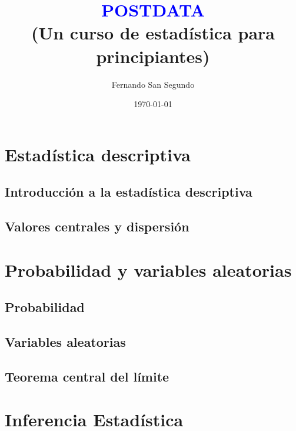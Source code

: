 \documentclass[10pt,a4paper]{book}
\begin{document}
\author{Fernando San Segundo}
\title{\textcolor{blue}{POSTDATA}\\
{\small (Un curso de estadística para principiantes)}}
\date{\today}

\pagestyle{plain}
\maketitle

\setcounter{tocdepth}{1}
\tableofcontents


\part{Estadística descriptiva}
%

    \chapter{Introducción a la estadística descriptiva}%
    

    \chapter{Valores centrales y dispersión}
    

\part{Probabilidad y variables aleatorias}
%   

    \chapter{Probabilidad}
    

    \chapter{Variables aleatorias}
    


    \chapter{Teorema central del límite}
    


\part{Inferencia Estadística}
%  
\end{document}
